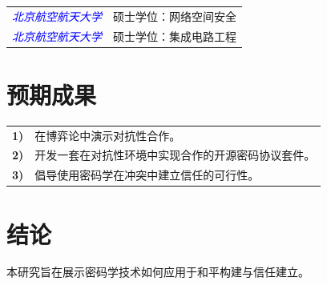 \documentclass[conference]{IEEEtran}
\begin{document}
\begin{tabular}{rl}
    \textcolor{blue}{\small\textit{北京航空航天大学}} & {\small 硕士学位：网络空间安全}\\
    \textcolor{blue}{\small\textit{北京航空航天大学}} & {\small 硕士学位：集成电路工程}
\end{tabular}

\section{预期成果}

\begin{tabular}{lp{210pt}}
    {\small \textbf{1)}} & {\small 在博弈论中演示对抗性合作。} \\
    {\small \textbf{2)}} & {\small 开发一套在对抗性环境中实现合作的开源密码协议套件。} \\
    {\small \textbf{3)}} & {\small 倡导使用密码学在冲突中建立信任的可行性。}
\end{tabular}

\section{结论}
本研究旨在展示密码学技术如何应用于和平构建与信任建立。








% 
% 
\end{document}
